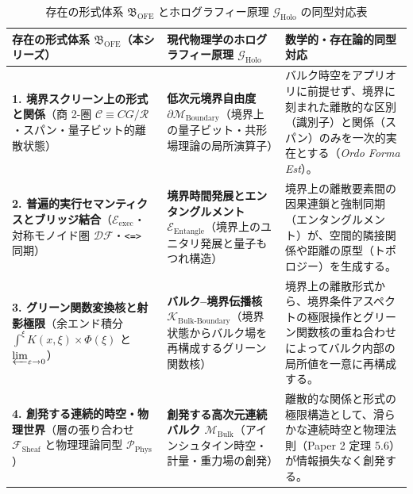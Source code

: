 \documentclass[11pt,a4paper]{ltjsarticle}
\theoremstyle{definition}
\theoremstyle{plain}
\begin{document}
\begin{table}[htbp]
\centering
\small
\renewcommand{\arraystretch}{1.4}
\begin{tabularx}{\textwidth}{@{} >{\raggedright\arraybackslash}p{} >{\raggedright\arraybackslash}p{} >{\raggedright\arraybackslash}X @{}}
\toprule
\textbf{存在の形式体系 $\mathfrak{B}_{\mathrm{OFE}}$（本シリーズ）} & \textbf{現代物理学のホログラフィー原理 $\mathcal{G}_{\mathrm{Holo}}$} & \textbf{数学的・存在論的同型対応} \\
\midrule
\textbf{1. 境界スクリーン上の形式と関係}\newline （商 2-圏 $\mathcal{C} \equiv CG/\mathcal{R}$・スパン・量子ビット的離散状態） & \textbf{低次元境界自由度 $\partial\mathcal{M}_{\mathrm{Boundary}}$}\newline （境界上の量子ビット・共形場理論の局所演算子） & バルク時空をアプリオリに前提せず、境界に刻まれた離散的な区別（識別子）と関係（スパン）のみを一次的実在とする（\textit{Ordo Forma Est}）。 \\
\midrule
\textbf{2. 普遍的実行セマンティクスとブリッジ結合}\newline （$\mathcal{E}_{\mathrm{exec}}$・対称モノイド圏 $\mathcal{DF}$・\texttt{<=>} 同期） & \textbf{境界時間発展とエンタングルメント $\mathcal{E}_{\mathrm{Entangle}}$}\newline （境界上のユニタリ発展と量子もつれ構造） & 境界上の離散要素間の因果連鎖と強制同期（エンタングルメント）が、空間的隣接関係や距離の原型（トポロジー）を生成する。 \\
\midrule
\textbf{3. グリーン関数変換核と射影極限}\newline （余エンド積分 $\int^{\xi} K(x,\xi) \times \Phi(\xi)$ と $\varprojlim_{\varepsilon \to 0}$） & \textbf{バルク–境界伝播核 $\mathcal{K}_{\mathrm{Bulk\text{-}Boundary}}$}\newline （境界状態からバルク場を再構成するグリーン関数核） & 境界上の離散形式から、境界条件アスペクトの極限操作とグリーン関数核の重ね合わせによってバルク内部の局所値を一意に再構成する。 \\
\midrule
\textbf{4. 創発する連続的時空・物理世界}\newline （層の張り合わせ $\mathcal{F}_{\mathrm{Sheaf}}$ と物理理論同型 $\mathcal{P}_{\mathrm{Phys}}$） & \textbf{創発する高次元連続バルク $\mathcal{M}_{\mathrm{Bulk}}$}\newline （アインシュタイン時空・計量・重力場の創発） & 離散的な関係と形式の極限構造として、滑らかな連続時空と物理法則（Paper 2 \cite{Ota2026_2} 定理 5.6）が情報損失なく創発する。 \\
\bottomrule
\end{tabularx}
\caption{存在の形式体系 $\mathfrak{B}_{\mathrm{OFE}}$ とホログラフィー原理 $\mathcal{G}_{\mathrm{Holo}}$ の同型対応表}
\end{table}
\end{document}
